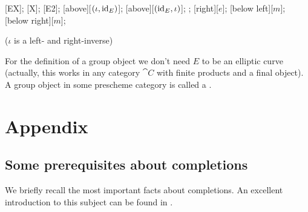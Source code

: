 \documentclass[a4paper,parskip=half,numbers=enddot, DIV=12]{scrreprt}
\begin{document}
\begin{rem}
\begin{center}
\begin{minipage}[b]{0.5\textwidth}
\begin{diagram*}
				[EX];
				[X];
				[E2];
				\scriptsize
				[above][$(\iota,\operatorname{id}_E)$];
				[above][$(\operatorname{id}_E,\iota)$];
				;
				;
				[$m$];
				[below right][$m$];
			\end{diagram*}
			($\iota$ is a left- and right-inverse)
		\end{minipage}
	\end{center}
	For the definition of a group object we don't need $E$ to be an elliptic curve (actually, this works in any category $\cat C$ with finite products and a final object). A group object in some prescheme category is called a .
\end{rem}

\Appendix
\chapter{Appendix}
\section{Some prerequisites about completions}
We briefly recall the most important facts about completions. An excellent introduction to this subject can be found in \cite[Section~10]{atiyahMacdonald}.
\end{document}
